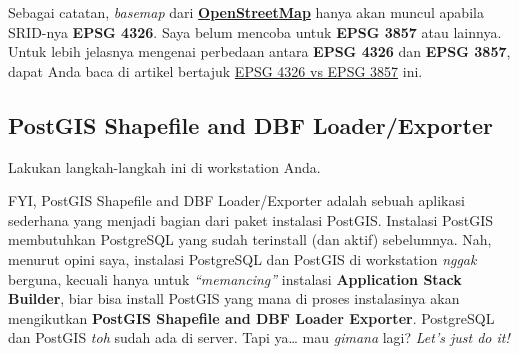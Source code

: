 \documentclass[]{book}
\begin{document}
Sebagai catatan, \emph{basemap} dari \href{}{\textbf{OpenStreetMap}} hanya akan muncul apabila SRID-nya \textbf{EPSG 4326}. Saya belum mencoba untuk \textbf{EPSG 3857} atau lainnya. Untuk lebih jelasnya mengenai perbedaan antara \textbf{EPSG 4326} dan \textbf{EPSG 3857}, dapat Anda baca di artikel bertajuk \href{https://lyzidiamond.com/posts/4326-vs-3857}{EPSG 4326 vs EPSG 3857} ini.

\hypertarget{postgis-shapefile-and-dbf-loaderexporter}{%
\subsection{PostGIS Shapefile and DBF Loader/Exporter}\label{postgis-shapefile-and-dbf-loaderexporter}}

Lakukan langkah-langkah ini di workstation Anda.

FYI, PostGIS Shapefile and DBF Loader/Exporter adalah sebuah aplikasi sederhana yang menjadi bagian dari paket instalasi PostGIS. Instalasi PostGIS membutuhkan PostgreSQL yang sudah terinstall (dan aktif) sebelumnya. Nah, menurut opini saya, instalasi PostgreSQL dan PostGIS di workstation \emph{nggak} berguna, kecuali hanya untuk \emph{``memancing''} instalasi \textbf{Application Stack Builder}, biar bisa install PostGIS yang mana di proses instalasinya akan mengikutkan \textbf{PostGIS Shapefile and DBF Loader Exporter}. PostgreSQL dan PostGIS \emph{toh} sudah ada di server. Tapi ya\ldots{} mau \emph{gimana} lagi? \emph{Let's just do it!}
\end{document}
